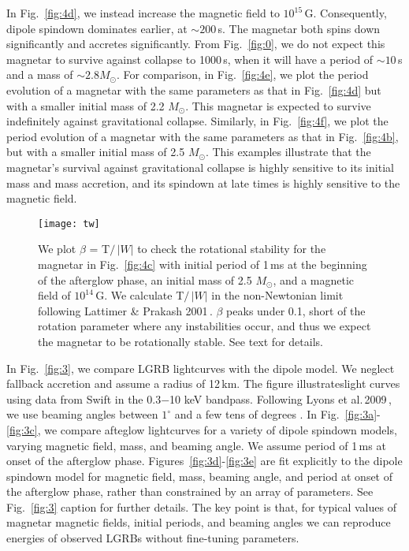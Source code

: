 \documentclass{article}
\begin{document}
In Fig.~\ref{fig:4d}, we instead increase the magnetic field to $10^{15}$\,G. Consequently, dipole spindown dominates earlier, at $\sim 200$\,s. The magnetar both spins down significantly and accretes significantly. From Fig.~\ref{fig:0}, we do not expect this magnetar to survive against collapse to 1000\,s, when it will have a period of $\sim 10$\,s and a mass of $\sim 2.8 M_{\odot}$. For comparison, in Fig.~\ref{fig:4e}, we plot the period evolution of a magnetar with the same parameters as that in Fig.~\ref{fig:4d} but with a smaller initial mass of 2.2 $M_{\odot}$. This magnetar is expected to survive indefinitely against gravitational collapse. Similarly, in Fig.~\ref{fig:4f}, we plot the period evolution of a magnetar with the same parameters as that in Fig.~\ref{fig:4b}, but with a smaller initial mass of 2.5 $M_{\odot}$. This examples illustrate that the magnetar's survival against gravitational collapse is highly sensitive to its initial mass and mass accretion, and its spindown at late times is highly sensitive to the magnetic field.

\begin{figure}[h!]
\centering
\texttt{[image: tw]}
\caption{We plot $\beta$ = T$/$\,$|W|$ to check the rotational stability for the magnetar in Fig.~\ref{fig:4c} with initial period of 1\,ms at the beginning of the afterglow phase, an initial mass of 2.5 $M_{\odot}$, and a magnetic field of $10^{14}$\,G. We calculate T$/$\,$|W|$ in the non-Newtonian limit following Lattimer \& Prakash 2001\,\cite{Lattimer:2001ap}. $\beta$ peaks under 0.1, short of the rotation parameter where any instabilities occur, and thus we expect the magnetar to be rotationally stable. See text for details.}
\label{fig:tw}
\end{figure}

In Fig.~\ref{fig:3}, we compare LGRB lightcurves with the dipole model. We neglect fallback accretion and assume a radius of 12\,km. The figure illustrateslight curves using data from Swift in the 0.3$-$10 keV bandpass. Following Lyons et al.\,2009\,\cite{Lyons:2009ka}, we use beaming angles between $1^{\circ}$ and a few tens of degrees \cite{Lyons:2009ka}.  In Fig.~\ref{fig:3a}-\ref{fig:3c}, we compare afteglow lightcurves for a variety of dipole spindown models, varying magnetic field, mass, and beaming angle. We assume period of 1\,ms at onset of the afterglow phase. Figures~\ref{fig:3d}-\ref{fig:3e} are fit explicitly to the dipole spindown model for magnetic field, mass, beaming angle, and period at onset of the afterglow phase, rather than constrained by an array of parameters. See Fig.~\ref{fig:3} caption for further details. The key point is that, for typical values of magnetar magnetic fields, initial periods, and beaming angles we can reproduce energies of observed LGRBs without fine-tuning parameters.
\end{document}
